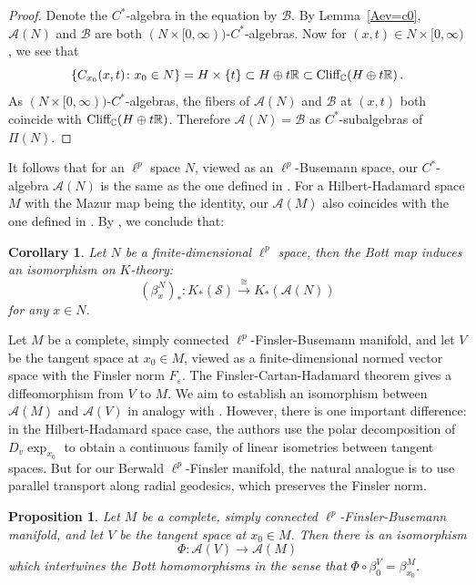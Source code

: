 \documentclass{article}
\theoremstyle{plain}
\newtheorem{proposition}[theorem]{Proposition}
\newtheorem{corollary}[theorem]{Corollary}
\theoremstyle{definition}
\renewcommand{\epsilon}{\varepsilon}
\theoremstyle{remark}
\def\A{\mathcal A}
\def\IR{\mathbb R}
\def\IC{\mathbb C}
\def\Cl{\textup{Cliff}_{\IC}}
\def\S{\mathcal S}
\begin{document}
	\begin{proof}
		Denote the $C^*$-algebra in the equation by $\mathcal{B}$. By Lemma~\ref{Aev=c0}, $\A(N)$ and $\mathcal{B}$ are both $( N \times [0, \infty) )$-$C^*$-algebras. 
		Now for $(x, t) \in N \times [0,\infty)$, we see that  
		\[
		\left\{ C_{x_0} (x,t) \colon x_0 \in N \right\} = H \times \{ t \} \subset H \oplus t \IR \subset \Cl (H \oplus t \IR) \, .
		\]
		As $( N \times [0, \infty) )$-$C^*$-algebras, the fibers of $\A(N)$ and $\mathcal{B}$ at $(x,t)$ both coincide with $\Cl (H\oplus t \IR )$. Therefore $\A(N) = \mathcal{B}$ as $C^*$-subalgebras of $\Pi(N)$. 
	\end{proof}
	
	It follows that for an $\ell^p$ space $N$, viewed as an $\ell^p$-Busemann space, our $C^*$-algebra $\A(N)$ is the same as the one defined in \cite{guo2024bott}. For a Hilbert-Hadamard space $M$ with the Mazur map being the identity, our $\A(M)$ also coincides with the one defined in \cite{gong2021novikov}. By \cite[Corollary 3.13]{guo2024bott}, we conclude that:
	
	\begin{corollary}Let $N$ be a finite-dimensional $\ell^p$ space, then the Bott map induces an isomorphism on $K$-theory:
		$$(\beta_x^N)_*:K_*(\S)\xrightarrow{\cong} K_*(\A(N))$$
		for any $x\in N$.
	\end{corollary}
	Let $M$ be a complete, simply connected $\ell^p$-Finsler-Busemann manifold, and let $V$ be the tangent space at $x_0\in M$, viewed as a finite-dimensional normed vector space with the Finsler norm $F_{\epsilon}$. The Finsler-Cartan-Hadamard theorem gives a diffeomorphism from $V$ to $M$. We aim to establish an isomorphism between $\A(M)$ and $\A(V)$ in analogy with \cite[Proposition 5.21]{gong2021novikov}. However, there is one important difference: in the Hilbert-Hadamard space case, the authors use the polar decomposition of $D_v\exp_{x_0}$ to obtain a continuous family of linear isometries between tangent spaces. But for our Berwald $\ell^p$-Finsler manifold, the natural analogue is to use parallel transport along radial geodesics, which preserves the Finsler norm.
	
	\begin{proposition}\label{prop_AofM-fin-dim}
		Let $M$ be a complete, simply connected $\ell^p$-Finsler-Busemann manifold, and let $V$ be the tangent space at $x_0\in M$. Then there is an isomorphism 
		\[
		\Phi \colon \A(V) \to \A(M)
		\]
		which intertwines the Bott homomorphisms in the sense that $\Phi \circ \beta_0^{V} = \beta_{x_0}^{M}$. 
	\end{proposition}
	
\end{document}
